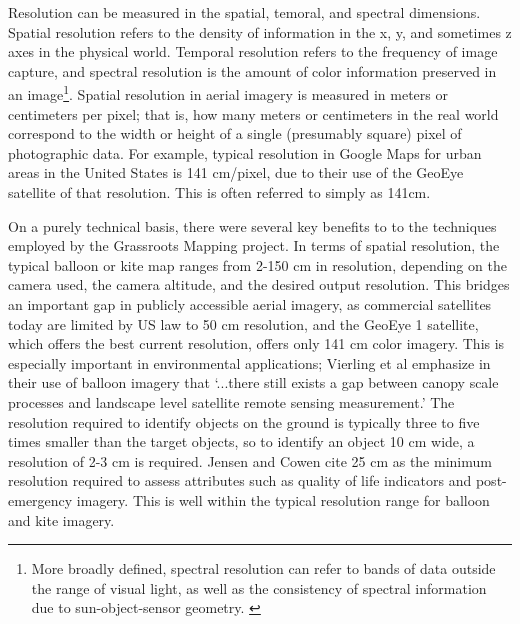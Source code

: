 \documentclass[11pt,oneside,notitlepage]{report}
\begin{document}
{{Resolution can be measured in the spatial, temoral, and spectral dimensions. Spatial resolution refers to the density of information in the x, y, and sometimes z axes in the physical world. Temporal resolution refers to the frequency of image capture, and spectral resolution is the amount of color information preserved in an image\footnote{More broadly defined, spectral resolution can refer to bands of data outside the range of visual light, as well as the consistency of spectral information due to sun-object-sensor geometry. \cite{tuominen2005landsat}}. Spatial resolution in aerial imagery is measured in meters or centimeters per pixel; that is, how many meters or centimeters in the real world correspond to the width or height of a single (presumably square) pixel of photographic data. For example, typical resolution in Google Maps for urban areas in the United States is 141 cm/pixel, due to their use of the GeoEye satellite of that resolution. This is often referred to simply as 141cm. 
 
On a purely technical basis, there were several key benefits to to the techniques employed by the Grassroots Mapping project. In terms of spatial resolution, the typical balloon or kite map ranges from 2-150 cm in resolution, depending on the camera used, the camera altitude, and the desired output resolution. This bridges an important gap in publicly accessible aerial imagery, as commercial satellites today are limited by US law to 50 cm resolution, and the GeoEye 1 satellite, which offers the best current resolution, offers only 141 cm color imagery. This is especially important in environmental applications; Vierling et al emphasize in their use of balloon imagery that `...there still exists a gap between canopy scale processes and landscape level satellite remote sensing measurement.' \cite{vierling2006short} The resolution required to identify objects on the ground is typically three to five times smaller than the target objects, so to identify an object 10 cm wide, a resolution of 2-3 cm is required. \cite{aber2002unmanned} Jensen and Cowen cite 25 cm as the minimum resolution required to assess attributes such as quality of life indicators and post-emergency imagery. This is well within the typical resolution range for balloon and kite imagery. \cite{jensen1999remote} 

}}
\end{document}
